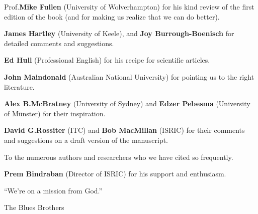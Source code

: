 \documentclass[graybox,envcountchap,sectrefs,UStrade]{svmono}
\begin{document}
Prof.\@ \textbf{Mike Fullen} (University of Wolverhampton) for his kind review of the first edition of the book (and for making us realize that we can do better).\par \bigskip

\textbf{James Hartley} (University of Keele), and \textbf{Joy Burrough-Boenisch} for detailed comments and suggestions.\par \bigskip

\textbf{Ed Hull} (Professional English) for his recipe for scientific articles.\par \bigskip

\textbf{John Maindonald} (Australian National University) for pointing us to the right literature.\par \bigskip

\textbf{Alex B.\@ McBratney} (University of Sydney) and \@ \textbf{Edzer Pebesma} (University of M\"{u}nster) for their inspiration. \par \bigskip

\textbf{David G.\@ Rossiter} (ITC) and \textbf{Bob MacMillan} (ISRIC) for their comments and suggestions on a draft version of the manuscript. \par \bigskip

To the numerous authors and researchers who we have cited so frequently.\par \bigskip

\textbf{Prem Bindraban} (Director of ISRIC) for his support and enthusiasm.\par

\bigskip

\begin{dedication}
\begin{center}
   ``We're on a mission from God.''
\end{center}
\bigskip
\begin{flushright}
    The Blues Brothers
\end{flushright}
\end{dedication}

\tableofcontents



\mainmatter%
\end{document}
